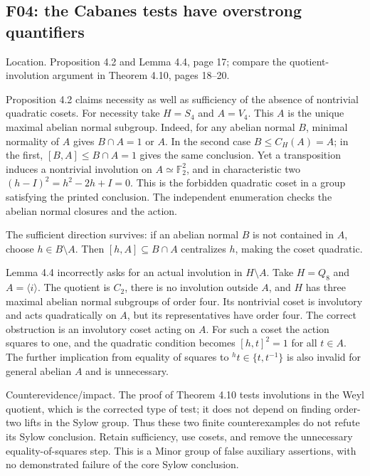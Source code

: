 \documentclass[10pt]{article}
\begin{document}
\subsection*{F04: the Cabanes tests have overstrong quantifiers}
Location. Proposition 4.2 and Lemma 4.4, page 17; compare the quotient-involution argument in Theorem 4.10, pages 18–20.\par
Proposition 4.2 claims necessity as well as sufficiency of the absence of nontrivial quadratic cosets. For necessity take \(H=S_4\) and \(A=V_4\). This \(A\) is the unique maximal abelian normal subgroup. Indeed, for any abelian normal \(B\), minimal normality of \(A\) gives \(B\cap A=1\) or \(A\). In the second case \(B\leq C_H(A)=A\); in the first, \([B,A]\leq B\cap A=1\) gives the same conclusion. Yet a transposition induces a nontrivial involution on \(A\simeq\mathbb F_2^2\), and in characteristic two \((h-I)^2=h^2-2h+I=0\). This is the forbidden quadratic coset in a group satisfying the printed conclusion. The independent enumeration checks the abelian normal closures and the action.\par
The sufficient direction survives: if an abelian normal \(B\) is not contained in \(A\), choose \(h\in B\setminus A\). Then \([h,A]\subseteq B\cap A\) centralizes \(h\), making the coset quadratic.\par
Lemma 4.4 incorrectly asks for an actual involution in \(H\setminus A\). Take \(H=Q_8\) and \(A=\langle i\rangle\). The quotient is \(C_2\), there is no involution outside \(A\), and \(H\) has three maximal abelian normal subgroups of order four. Its nontrivial coset is involutory and acts quadratically on \(A\), but its representatives have order four. The correct obstruction is an involutory coset acting on \(A\). For such a coset the action squares to one, and the quadratic condition becomes \([h,t]^2=1\) for all \(t\in A\). The further implication from equality of squares to \({}^ht\in\{t,t^{-1}\}\) is also invalid for general abelian \(A\) and is unnecessary.\par
Counterevidence/impact. The proof of Theorem 4.10 tests involutions in the Weyl quotient, which is the corrected type of test; it does not depend on finding order-two lifts in the Sylow group. Thus these two finite counterexamples do not refute its Sylow conclusion. Retain sufficiency, use cosets, and remove the unnecessary equality-of-squares step. This is a Minor group of false auxiliary assertions, with no demonstrated failure of the core Sylow conclusion.\par
\end{document}
